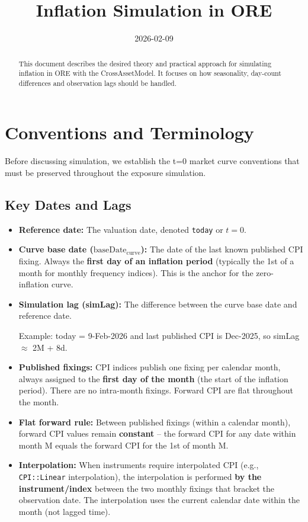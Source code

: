 \documentclass[11pt,a4paper]{article}
\title{Inflation Simulation in ORE}
\date{2026-02-09}
\newcommand{\code}[1]{\texttt{#1}}
\begin{document}
\maketitle

\begin{abstract}
This document describes the desired theory and practical approach for simulating inflation in ORE with the CrossAssetModel. It focuses on how seasonality, day-count differences and observation lags should be handled.
\end{abstract}

\section{Conventions and Terminology}

Before discussing simulation, we establish the t=0 market curve conventions that must be preserved throughout the exposure simulation.

\subsection{Key Dates and Lags}

\begin{itemize}[leftmargin=*]

\item \textbf{Reference date:} The valuation date, denoted \code{today} or $t=0$.

\item \textbf{Curve base date ($\text{baseDate}_{\text{curve}}$):} The date of the last known published CPI fixing. Always the \textbf{first day of an inflation period} (typically the 1st of a month for monthly frequency indices). This is the anchor for the zero-inflation curve.

\item \textbf{Simulation lag (simLag):} The difference between the curve base date and reference date.
  
  Example: today = 9-Feb-2026 and last published CPI is Dec-2025, so simLag $\approx$ 2M + 8d.

\item \textbf{Published fixings:} CPI indices publish one fixing per calendar month, always assigned to the \textbf{first day of the month} (the start of the inflation period). There are no intra-month fixings. Forward CPI are flat throughout the month.

\item \textbf{Flat forward rule:} Between published fixings (within a calendar month), forward CPI values remain \textbf{constant} -- the forward CPI for any date within month M equals the forward CPI for the 1st of month M.

\item \textbf{Interpolation:} When instruments require interpolated CPI (e.g., \code{CPI::Linear} interpolation), the interpolation is performed \textbf{by the instrument/index} between the two monthly fixings that bracket the observation date. The interpolation uses the current calendar date within the month (not lagged time).
\end{itemize}
\end{document}
